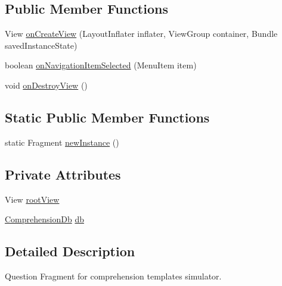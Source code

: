 \subsection*{Public Member Functions}
\begin{DoxyCompactItemize}
\item 
View \hyperlink{classorg_1_1buildmlearn_1_1toolkit_1_1comprehensiontemplate_1_1fragment_1_1QuestionFragment_a4794584d3f9a5d13b67d98d0fb40db53}{on\+Create\+View} (Layout\+Inflater inflater, View\+Group container, Bundle saved\+Instance\+State)
\item 
boolean \hyperlink{classorg_1_1buildmlearn_1_1toolkit_1_1comprehensiontemplate_1_1fragment_1_1QuestionFragment_a3ae44b8479754e4040df0de8a223a996}{on\+Navigation\+Item\+Selected} (Menu\+Item item)
\item 
void \hyperlink{classorg_1_1buildmlearn_1_1toolkit_1_1comprehensiontemplate_1_1fragment_1_1QuestionFragment_a90fca30ed5132778611fe3017fa05a0d}{on\+Destroy\+View} ()
\end{DoxyCompactItemize}
\subsection*{Static Public Member Functions}
\begin{DoxyCompactItemize}
\item 
static Fragment \hyperlink{classorg_1_1buildmlearn_1_1toolkit_1_1comprehensiontemplate_1_1fragment_1_1QuestionFragment_a22b7f13f5f4154099dda8b5a71ad3f90}{new\+Instance} ()
\end{DoxyCompactItemize}
\subsection*{Private Attributes}
\begin{DoxyCompactItemize}
\item 
View \hyperlink{classorg_1_1buildmlearn_1_1toolkit_1_1comprehensiontemplate_1_1fragment_1_1QuestionFragment_afea25d76857605e7164fc6d8e018681e}{root\+View}
\item 
\hyperlink{classorg_1_1buildmlearn_1_1toolkit_1_1comprehensiontemplate_1_1data_1_1ComprehensionDb}{Comprehension\+Db} \hyperlink{classorg_1_1buildmlearn_1_1toolkit_1_1comprehensiontemplate_1_1fragment_1_1QuestionFragment_aac831a44face7bc6a677c64b7087f298}{db}
\end{DoxyCompactItemize}


\subsection{Detailed Description}
Question Fragment for comprehension template\textquotesingle{}s simulator. 

